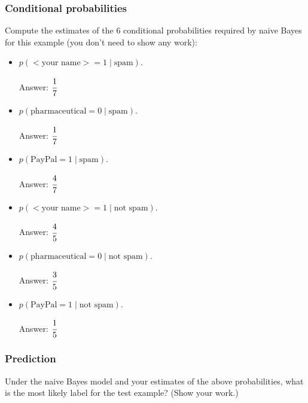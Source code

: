 \documentclass{article}
\def\ans#1{\par\gre{Answer: #1}}
\def\blu#1{{\color{blu}#1}}
\def\gre#1{{\color{gre}#1}}
\def\cond{\; | \;}
\def\items#1{\begin{itemize}#1\end{itemize}}
\begin{document}
\subsubsection{Conditional probabilities}

\blu{Compute the estimates of the 6 conditional probabilities required by naive Bayes for this example}  (you don't need to show any work):
\items{
\item $p(\text{$<$your name$>$} = 1  \cond \text{spam})$. \ans {$\cfrac{1}{7}$}
\item $p(\text{pharmaceutical} = 0 \cond \text{spam})$. \ans {$\cfrac{1}{7}$}
\item $p(\text{PayPal} = 1  \cond \text{spam})$. \ans {$\cfrac{4}{7}$}
\item $p(\text{$<$your name$>$} = 1  \cond \text{not spam})$. \ans {$\cfrac{4}{5}$}
\item $p(\text{pharmaceutical} = 0  \cond \text{not spam})$. \ans {$\cfrac{3}{5}$}
\item $p(\text{PayPal} = 1  \cond \text{not spam})$. \ans {$\cfrac{1}{5}$}
}

\subsubsection{Prediction}


\blu{Under the naive Bayes model and your estimates of the above probabilities, what is the most likely label for the test example? (Show your work.)}
\end{document}
